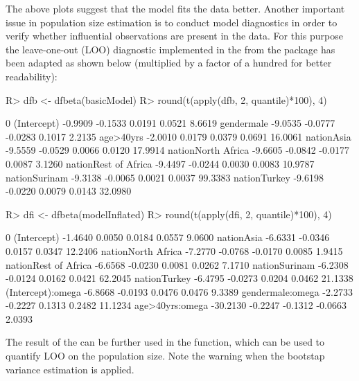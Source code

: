 \documentclass[
]{jss}
\newcommand{\1}{\mathcal{I}} \newcommand{\bZero}{\boldsymbol{0}}
\begin{document}
The above plots suggest that the  model fits the data
better. Another important issue in population size estimation is to
conduct model diagnostics in order to verify whether influential
observations are present in the data. For this purpose the leave-one-out
(LOO) diagnostic implemented in the  from the 
package has been adapted as shown below (multiplied by a factor of a
hundred for better readability):

\begin{CodeChunk}
\begin{CodeInput}
R> dfb <- dfbeta(basicModel)
R> round(t(apply(dfb, 2, quantile)*100), 4)
\end{CodeInput}
\begin{CodeOutput}
                          0%
(Intercept)          -0.9909 -0.1533  0.0191 0.0521  8.6619
gendermale           -9.0535 -0.0777 -0.0283 0.1017  2.2135
age>40yrs            -2.0010  0.0179  0.0379 0.0691 16.0061
nationAsia           -9.5559 -0.0529  0.0066 0.0120 17.9914
nationNorth Africa   -9.6605 -0.0842 -0.0177 0.0087  3.1260
nationRest of Africa -9.4497 -0.0244  0.0030 0.0083 10.9787
nationSurinam        -9.3138 -0.0065  0.0021 0.0037 99.3383
nationTurkey         -9.6198 -0.0220  0.0079 0.0143 32.0980
\end{CodeOutput}
\end{CodeChunk}

\begin{CodeChunk}
\begin{CodeInput}
R> dfi <- dfbeta(modelInflated)
R> round(t(apply(dfi, 2, quantile)*100), 4)
\end{CodeInput}
\begin{CodeOutput}
                           0%
(Intercept)           -1.4640  0.0050  0.0184  0.0557  9.0600
nationAsia            -6.6331 -0.0346  0.0157  0.0347 12.2406
nationNorth Africa    -7.2770 -0.0768 -0.0170  0.0085  1.9415
nationRest of Africa  -6.6568 -0.0230  0.0081  0.0262  7.1710
nationSurinam         -6.2308 -0.0124  0.0162  0.0421 62.2045
nationTurkey          -6.4795 -0.0273  0.0204  0.0462 21.1338
(Intercept):omega     -6.8668 -0.0193  0.0476  0.0476  9.3389
gendermale:omega      -2.2733 -0.2227  0.1313  0.2482 11.1234
age>40yrs:omega      -30.2130 -0.2247 -0.1312 -0.0663  2.0393
\end{CodeOutput}
\end{CodeChunk}

The result of the  can be further used in the
 function, which can be used to quantify LOO on the
population size. Note the warning when the bootstap variance estimation
is applied.
\end{document}
